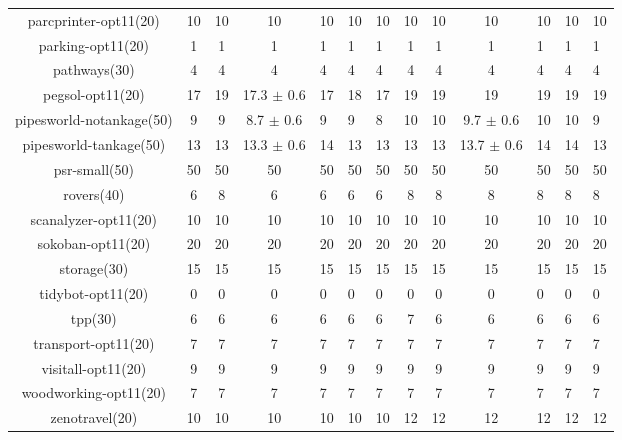 \begin{center}
\begin{tabular}{|c|cccHHH|cccHHH|}
parcprinter-opt11(20) & 10 & 10 & 10 & 10 & 10 & 10 & 10 & 10 & 10 & 10 & 10 & 10\\
parking-opt11(20) & 1 & 1 & 1 & 1 & 1 & 1 & 1 & 1 & 1 & 1 & 1 & 1\\
pathways(30) & 4 & 4 & 4 & 4 & 4 & 4 & 4 & 4 & 4 & 4 & 4 & 4\\
pegsol-opt11(20) & 17 & 19 & 17.3 $\pm$ 0.6 & 17 & 18 & 17 & 19 & 19 & 19 & 19 & 19 & 19\\
pipesworld-notankage(50) & 9 & 9 & 8.7 $\pm$ 0.6 & 9 & 9 & 8 & 10 & 10 & 9.7 $\pm$ 0.6 & 10 & 10 & 9\\
pipesworld-tankage(50) & 13 & 13 & 13.3 $\pm$ 0.6 & 14 & 13 & 13 & 13 & 13 & 13.7 $\pm$ 0.6 & 14 & 14 & 13\\
psr-small(50) & 50 & 50 & 50 & 50 & 50 & 50 & 50 & 50 & 50 & 50 & 50 & 50\\
rovers(40) & 6 & 8 & 6 & 6 & 6 & 6 & 8 & 8 & 8 & 8 & 8 & 8\\
scanalyzer-opt11(20) & 10 & 10 & 10 & 10 & 10 & 10 & 10 & 10 & 10 & 10 & 10 & 10\\
sokoban-opt11(20) & 20 & 20 & 20 & 20 & 20 & 20 & 20 & 20 & 20 & 20 & 20 & 20\\
storage(30) & 15 & 15 & 15 & 15 & 15 & 15 & 15 & 15 & 15 & 15 & 15 & 15\\
tidybot-opt11(20) & 0 & 0 & 0 & 0 & 0 & 0 & 0 & 0 & 0 & 0 & 0 & 0\\
tpp(30) & 6 & 6 & 6 & 6 & 6 & 6 & 7 & 6 & 6 & 6 & 6 & 6\\
transport-opt11(20) & 7 & 7 & 7 & 7 & 7 & 7 & 7 & 7 & 7 & 7 & 7 & 7\\
visitall-opt11(20) & 9 & 9 & 9 & 9 & 9 & 9 & 9 & 9 & 9 & 9 & 9 & 9\\
woodworking-opt11(20) & 7 & 7 & 7 & 7 & 7 & 7 & 7 & 7 & 7 & 7 & 7 & 7\\
zenotravel(20) & 10 & 10 & 10 & 10 & 10 & 10 & 12 & 12 & 12 & 12 & 12 & 12\\
\hline
\end{tabular}
\end{center}
